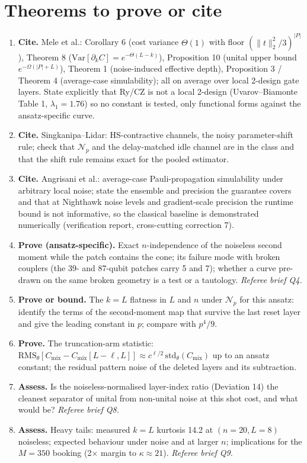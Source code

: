 \documentclass[11pt,a4paper]{article}
\newcommand{\Var}{\mathrm{Var}}
\newcommand{\Np}{\mathcal{N}_p}
\begin{document}
\section{Theorems to prove or cite}
\begin{enumerate}
\item \textbf{Cite.} Mele et al.: Corollary 6 (cost variance $\Theta(1)$ with floor $(\|t\|_2^2/3)^{|P|}$), Theorem 8 ($\Var[\partial_k C] = e^{-\Theta(L-k)}$), Proposition 10 (unital upper bound $e^{-\Omega(|P|+L)}$), Theorem 1 (noise-induced effective depth), Proposition 3 / Theorem 4 (average-case simulability); all on average over local 2-design gate layers. State explicitly that Ry/CZ is not a local 2-design (Uvarov--Biamonte Table 1, $\lambda_1 = 1.76$) so no constant is tested, only functional forms against the ansatz-specific curve.
\item \textbf{Cite.} Singkanipa--Lidar: HS-contractive channels, the noisy parameter-shift rule; check that $\Np$ and the delay-matched idle channel are in the class and that the shift rule remains exact for the pooled estimator.
\item \textbf{Cite.} Angrisani et al.: average-case Pauli-propagation simulability under arbitrary local noise; state the ensemble and precision the guarantee covers and that at Nighthawk noise levels and gradient-scale precision the runtime bound is not informative, so the classical baseline is demonstrated numerically (verification report, cross-cutting correction 7).
\item \textbf{Prove (ansatz-specific).} Exact $n$-independence of the noiseless second moment while the patch contains the cone; its failure mode with broken couplers (the 39- and 87-qubit patches carry 5 and 7); whether a curve pre-drawn on the same broken geometry is a test or a tautology. \emph{Referee brief Q4.}
\item \textbf{Prove or bound.} The $k = L$ flatness in $L$ and $n$ under $\Np$ for this ansatz: identify the terms of the second-moment map that survive the last reset layer and give the leading constant in $p$; compare with $p^4/9$.
\item \textbf{Prove.} The truncation-arm statistic: $\mathrm{RMS}_\theta[C_{\mathrm{mix}} - C_{\mathrm{mix}}[L-\ell, L]] \approx c^{\ell/2}\,\mathrm{std}_\theta(C_{\mathrm{mix}})$ up to an ansatz constant; the residual pattern noise of the deleted layers and its subtraction.
\item \textbf{Assess.} Is the noiseless-normalised layer-index ratio (Deviation 14) the cleanest separator of unital from non-unital noise at this shot cost, and what would be? \emph{Referee brief Q8.}
\item \textbf{Assess.} Heavy tails: measured $k = L$ kurtosis 14.2 at $(n = 20, L = 8)$ noiseless; expected behaviour under noise and at larger $n$; implications for the $M = 350$ booking (2$\times$ margin to $\kappa \approx 21$). \emph{Referee brief Q9.}
\end{enumerate}
\end{document}
